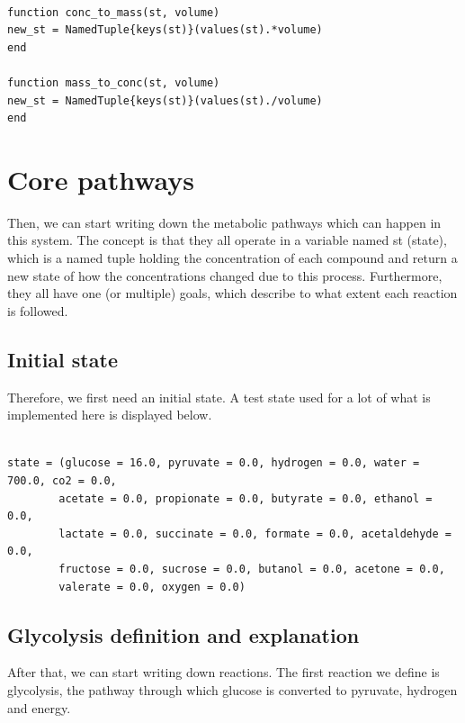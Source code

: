 \documentclass[11pt]{article}
\begin{document}
\begin{verbatim}

function conc_to_mass(st, volume)
new_st = NamedTuple{keys(st)}(values(st).*volume)
end

function mass_to_conc(st, volume)
new_st = NamedTuple{keys(st)}(values(st)./volume)
end

\end{verbatim}

\section{Core pathways}
\label{sec:orgf3385fc}
Then, we can start writing down the metabolic pathways which can happen in this system. The concept is that they all operate in a variable named st (state), which is a named tuple holding the concentration of each compound and return a new state of how the concentrations changed due to this process. Furthermore, they all have one (or multiple) goals, which describe to what extent each reaction is followed.

\subsection{Initial state}
\label{sec:org3355eae}
Therefore, we first need an initial state. A test state used for a lot of what is implemented here is displayed below.

\begin{verbatim}

state = (glucose = 16.0, pyruvate = 0.0, hydrogen = 0.0, water = 700.0, co2 = 0.0,
        acetate = 0.0, propionate = 0.0, butyrate = 0.0, ethanol = 0.0,
        lactate = 0.0, succinate = 0.0, formate = 0.0, acetaldehyde = 0.0,
        fructose = 0.0, sucrose = 0.0, butanol = 0.0, acetone = 0.0,
        valerate = 0.0, oxygen = 0.0)

\end{verbatim}

\subsection{Glycolysis definition and explanation}
\label{sec:org1d9040d}
After that, we can start writing down reactions. The first reaction we define is glycolysis, the pathway through which glucose is converted to pyruvate, hydrogen and energy. 
\end{document}
